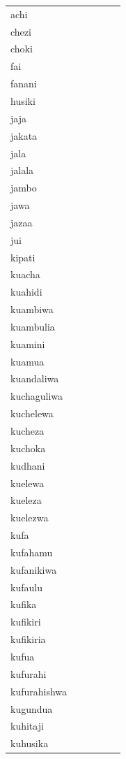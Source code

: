 \documentclass[output=paper,colorlinks,citecolor=brown]{langscibook}
\begin{document}
\begin{table}
\begin{footnotesize}


\begin{minipage}{.24\textwidth}
\begin{tabular}{llllll}
achi \\ 
chezi \\ 
choki \\ 
fai \\ 
fanani \\ 
husiki \\ 
jaja \\ 
jakata \\ 
jala \\ 
jalala \\ 
jambo \\ 
jawa \\ 
jazaa \\ 
jui \\ 
kipati \\\hline 
kuacha \\ 
kuahidi \\ 
kuambiwa \\ 
kuambulia \\ 
kuamini \\ 
kuamua \\ 
kuandaliwa \\ 
kuchaguliwa \\ 
kuchelewa \\ 
kucheza \\ 
kuchoka \\ 
kudhani \\ 
kuelewa \\ 
kueleza \\ 
kuelezwa \\ 
kufa \\ 
kufahamu \\ 
kufanikiwa \\ 
kufaulu \\ 
kufika \\ 
kufikiri \\ 
kufikiria \\ 
kufua \\ 
kufurahi \\ 
kufurahishwa \\ 
kugundua \\ 
kuhitaji \\ 
kuhusika \\ 


\end{tabular}
\end{minipage}
\end{footnotesize}
\end{table}
\end{document}
